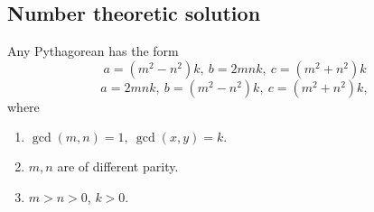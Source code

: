 %
%
%
%
%
%

\subsection{Number theoretic solution}

%

\begin{thm}
Any Pythagorean has the form
$$a=(m^2-n^2)k , \ b=2mnk, \ c=(m^2+n^2)k$$
$$a=2mnk, \ b=(m^2-n^2)k,\ c=(m^2+n^2)k, $$
where
\begin{enumerate}
\item $\gcd(m,n)=1, \ \gcd(x,y)=k.$
\item $m,n$ are of different parity.
\item $m>n>0$, $k>0$.
\end{enumerate}
\end{thm}

